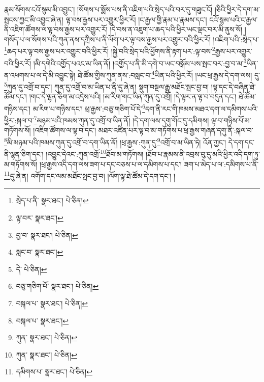 རྣམ་སོགས་ངའོ་སྙམ་མི་འབྱུང་། །སོགས་པ་སྨོས་པས་ནི་འཇིག་པའི་སྲེད་པའི་བར་དུ་གཟུང་ངོ། །ཅིའི་ཕྱིར་དེ་དག་མ་སྤངས་ཀྱང་མི་འབྱུང་ཞེ་ན། ལྟ་བས་རྒྱས་པར་འགྱུར་ཕྱིར་རོ། །ང་རྒྱལ་གྱི་རྣམ་པ་རྣམས་དང་། ངའོ་སྙམ་པའི་ང་རྒྱལ་ནི་འཇིག་ཚོགས་ལ་ལྟ་བས་རྒྱས་པར་འགྱུར་རོ། །དེ་བས་ན་འཇུག་པ་ཆད་པའི་ཕྱིར་ཡང་ལྡང་བར་མི་ནུས་སོ། །གསོད་པ་ལ་སོགས་པའི་ཀུན་ནས་དཀྲིས་པ་ནི་ལོག་པར་ལྟ་བས་རྒྱས་པར་འགྱུར་བའི་ཕྱིར་རོ། །འཇིག་པའི་:སྲེད་པ་\footnote{སྲེད་པ་ནི་  སྣར་ཐང་།  པེ་ཅིན། }ཆད་པར་ལྟ་བས་རྒྱས་པར་འགྱུར་བའི་ཕྱིར་རོ། །སྐྱེ་བའི་སྲེད་པའི་ཕྱོགས་ནི་རྟག་པར་:ལྟ་བས་\footnote{ལྟ་བར་  སྣར་ཐང་། }རྒྱས་པར་འགྱུར་བའི་ཕྱིར་རོ། །མི་དགེའི་འགྱོད་པའང་མ་ཡིན་ནོ། །འགྱོད་པ་ནི་མི་དགེ་བ་ཡང་བསྒོམ་པས་སྤང་བར་:བྱ་བ་མ་\footnote{བྱ་བ་  སྣར་ཐང་།  པེ་ཅིན། }ཡིན་ན་འཕགས་པ་ལ་དེ་མི་འབྱུང་སྟེ། ཐེ་ཚོམ་གྱིས་ཀུན་ནས་:བསླང་བ་\footnote{སླང་བ་  སྣར་ཐང་། }ཡིན་པའི་ཕྱིར་རོ། །ཡང་ཕྲ་རྒྱས་དེ་དག་ལས། དུ་\footnote{དེ་  པེ་ཅིན། }ཀུན་དུ་འགྲོ་བ་དང་། ཀུན་དུ་འགྲོ་བ་མ་ཡིན་པ་ནི་དུ་ཞེ་ན། སྡུག་བསྔལ་རྒྱུ་མཐོང་སྤང་བྱ་བ། །ལྟ་དང་དེ་བཞིན་ཐེ་ཚོམ་དང་། །གང་དེ་ལྷན་ཅིག་མ་འདྲེས་པའི། །མ་རིག་གང་ཡིན་ཀུན་དུ་འགྲོ། །དེ་ལྟར་ན་ལྟ་བ་བདུན་དང་། ཐེ་ཚོམ་གཉིས་དང་། མ་རིག་པ་གཉིས་དང་། ཕྲ་རྒྱས་:བཅུ་གཅིག་པོ་དེ་\footnote{བཅུ་གཅིག་པོ་  སྣར་ཐང་།  པེ་ཅིན། }དག་ནི་རང་གི་ཁམས་མཐའ་དག་ལ་དམིགས་པའི་ཕྱིར་:སྐལ་བ་\footnote{བསྐལ་པ་  སྣར་ཐང་།  པེ་ཅིན། }མཉམ་པའི་ཁམས་ཀུན་དུ་འགྲོ་བ་ཡིན་ནོ། །དེ་དག་ལས་དགུ་གོང་དུ་དམིགས། ལྟ་བ་གཉིས་པོ་མ་གཏོགས་སོ། །འཇིག་ཚོགས་ལ་ལྟ་བ་དང་། མཐར་འཛིན་པར་ལྟ་བ་མ་གཏོགས་པ་ཕྲ་རྒྱས་གཞན་དགུ་ནི་:སྐལ་བ་\footnote{བསྐལ་པ་  སྣར་ཐང་། }མི་མཉམ་པའི་ཁམས་ཀུན་དུ་འགྲོ་བ་དག་ཡིན་ནོ། །ཕྲ་རྒྱས་:ཀུན་དུ་\footnote{ཀུན་  སྣར་ཐང་།  པེ་ཅིན། }འགྲོ་བ་མ་ཡིན་ཏེ། འོན་ཀྱང་། དེ་དག་དང་ནི་ལྷན་ཅིག་དང་། །འབྱུང་དེའང་:ཀུན་འགྲོ་\footnote{ཀུན་  སྣར་ཐང་།  པེ་ཅིན། }ཐོབ་མ་གཏོགས། །ཐོབ་པ་རྣམས་ནི་འབྲས་བུ་དུ་མའི་ཕྱིར་འདི་དག་ཏུ་མ་གཏོགས་སོ། །ཕྲ་རྒྱས་འདི་དག་ལས་ཟག་པ་དང་བཅས་པ་ལ་དམིགས་པ་དང་། ཟག་པ་མེད་པ་ལ་:དམིགས་པ་ནི་\footnote{དམིགས་པ་  སྣར་ཐང་།  པེ་ཅིན། }དུ་ཞེ་ན། འགོག་དང་ལམ་མཐོང་སྤང་བྱ་བ། །ལོག་ལྟ་ཐེ་ཚོམ་དེ་དག་དང་། །
